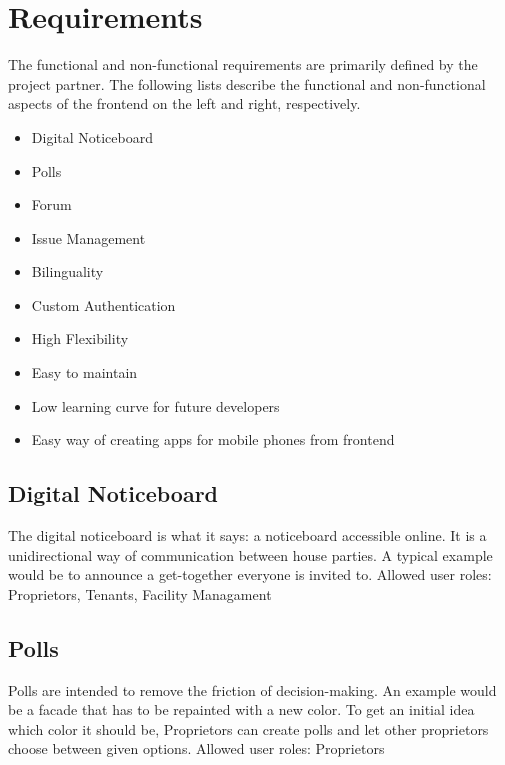 \section{Requirements}
The functional and non-functional requirements are primarily defined by the project partner. The following lists describe the functional and non-functional aspects of the frontend on the left and right, respectively. \newline

\begin{minipage}{.5\textwidth}
    \begin{itemize}
        \item Digital Noticeboard
        \item Polls
        \item Forum
        \item Issue Management
        \item Bilinguality
        \item Custom Authentication
    \end{itemize}
\end{minipage}%
\begin{minipage}{.5\textwidth}
    \begin{itemize}
        \item High Flexibility 
        \item Easy to maintain
        \item Low learning curve for future developers
        \item Easy way of creating apps for mobile phones from frontend
    \end{itemize}
\end{minipage}

  
\subsection{Digital Noticeboard}
The digital noticeboard is what it says: a noticeboard accessible online. It is a unidirectional way of communication between house parties. A typical example would be to announce a get-together everyone is invited to. \newline
Allowed user roles: Proprietors, Tenants, Facility Managament

\subsection{Polls}
Polls are intended to remove the friction of decision-making. An example would be a facade that has to be repainted with a new color. To get an initial idea which color it should be, Proprietors can create polls and let other proprietors choose between given options. \newline
Allowed user roles: Proprietors

